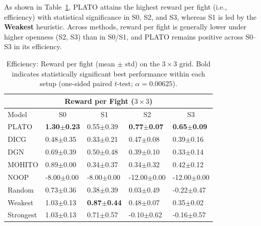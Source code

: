 As shown in Table~\ref{tab:rpf_3x3}, PLATO attains the highest reward per fight (i.e., efficiency) with statistical significance in S0, S2, and S3, whereas S1 is led by the \textbf{Weakest} heuristic. Across methods, reward per fight is generally lower under higher openness (S2, S3) than in S0/S1, and PLATO remains positive across S0--S3 in its efficiency.
\begin{table}[t]
\centering
\small
\setlength{\tabcolsep}{2.5pt}
\renewcommand{\arraystretch}{1.03}
\begin{tabular}{l|l|l|l|l}
\toprule
\multicolumn{5}{c}{Reward per Fight ($3\times 3$)} \\
\midrule
Model & \multicolumn{1}{c|}{S0} & \multicolumn{1}{c|}{S1} & \multicolumn{1}{c|}{S2} & \multicolumn{1}{c}{S3} \\
\midrule

PLATO & \textbf{1.30$\pm$0.23} & 0.55$\pm$0.39 & \textbf{0.77$\pm$0.07} & \textbf{0.65$\pm$0.09} \\
DICG & 0.48$\pm$0.35 & 0.33$\pm$0.21 & 0.47$\pm$0.08 & 0.39$\pm$0.16 \\
DGN & 0.69$\pm$0.39 & 0.50$\pm$0.48 & 0.39$\pm$0.10 & 0.33$\pm$0.14 \\
MOHITO & 0.89$\pm$0.00 & 0.34$\pm$0.37 & 0.34$\pm$0.32 & 0.42$\pm$0.12 \\
NOOP & -8.00$\pm$0.00 & -8.00$\pm$0.00 & -12.00$\pm$0.00 & -12.00$\pm$0.00 \\
Random & 0.73$\pm$0.36 & 0.38$\pm$0.39 & 0.03$\pm$0.49 & -0.22$\pm$0.47 \\
Weakest & 1.03$\pm$0.13 & \textbf{0.87$\pm$0.44} & 0.48$\pm$0.07 & 0.35$\pm$0.02 \\
Strongest & 1.03$\pm$0.13 & 0.71$\pm$0.57 & -0.10$\pm$0.62 & -0.16$\pm$0.57 \\

\bottomrule
\end{tabular}
\caption{Efficiency: Reward per fight (mean $\pm$ std) on the $3\times 3$ grid. Bold indicates statistically significant best performance within each setup (one-sided paired $t$-test; $\alpha=0.00625$).}
\label{tab:rpf_3x3}
\end{table}




